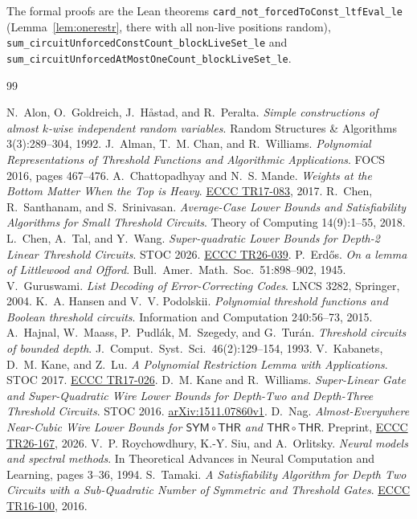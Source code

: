 \documentclass[11pt,letterpaper]{article}
\theoremstyle{remark}
\newcommand{\THR}{\mathsf{THR}}
\begin{document}
The formal proofs are the Lean theorems
\texttt{card\_not\_forcedToConst\_ltfEval\_le} (Lemma~\ref{lem:onerestr}, there
with all non-live positions random),
\texttt{sum\_circuitUnforcedConstCount\_blockLiveSet\_le} and
\texttt{sum\_circuitUnforcedAtMostOneCount\_blockLiveSet\_le}.

\renewcommand{\refname}{\texorpdfstring{\color{ink}References}{References}}
\begin{thebibliography}{99}\setlength{\itemsep}{0pt}\footnotesize

 N.~Alon, O.~Goldreich, J.~H{\aa}stad, and R.~Peralta.
\emph{Simple constructions of almost $k$-wise independent random variables}.
Random Structures \& Algorithms 3(3):289--304, 1992.
 J.~Alman, T.~M. Chan, and R.~Williams.
\emph{Polynomial Representations of Threshold Functions and Algorithmic
Applications}. FOCS 2016, pages 467--476.
 A.~Chattopadhyay and N.~S. Mande.
\emph{Weights at the Bottom Matter When the Top is Heavy}.
\href{https://eccc.weizmann.ac.il/report/2017/083/}{ECCC TR17-083}, 2017.
 R.~Chen, R.~Santhanam, and S.~Srinivasan.
\emph{Average-Case Lower Bounds and Satisfiability Algorithms for Small
Threshold Circuits}. Theory of Computing 14(9):1--55, 2018.
 L.~Chen, A.~Tal, and Y.~Wang.
\emph{Super-quadratic Lower Bounds for Depth-2 Linear Threshold Circuits}.
STOC 2026. \href{https://eccc.weizmann.ac.il/report/2026/039/}{ECCC TR26-039}.
 P.~Erd\H{o}s. \emph{On a lemma of Littlewood and Offord}.
Bull.\ Amer.\ Math.\ Soc.\ 51:898--902, 1945.
 V.~Guruswami. \emph{List Decoding of Error-Correcting Codes}.
LNCS 3282, Springer, 2004.
 K.~A. Hansen and V.~V. Podolskii. \emph{Polynomial threshold
functions and Boolean threshold circuits}. Information and Computation
240:56--73, 2015.
 A.~Hajnal, W.~Maass, P.~Pudl\'ak, M.~Szegedy, and
G.~Tur\'an. \emph{Threshold circuits of bounded depth}. J.\ Comput.\ Syst.\
Sci.\ 46(2):129--154, 1993.
 V.~Kabanets, D.~M. Kane, and Z.~Lu.
\emph{A Polynomial Restriction Lemma with Applications}. STOC 2017.
\href{https://eccc.weizmann.ac.il/report/2017/026/}{ECCC TR17-026}.
\bibitem{KW} D.~M. Kane and R.~Williams.
\emph{Super-Linear Gate and Super-Quadratic Wire Lower Bounds for Depth-Two
and Depth-Three Threshold Circuits}. STOC 2016.
\href{https://arxiv.org/abs/1511.07860}{arXiv:1511.07860v1}.
 D.~Nag. \emph{Almost-Everywhere Near-Cubic Wire Lower Bounds for
$\mathsf{SYM}\circ\THR$ and $\THR\circ\THR$}. Preprint,
\href{https://eccc.weizmann.ac.il/report/2026/167/}{ECCC TR26-167}, 2026.
\bibitem{RSO} V.~P. Roychowdhury, K.-Y. Siu, and A.~Orlitsky.
\emph{Neural models and spectral methods}. In Theoretical Advances in Neural
Computation and Learning, pages 3--36, 1994.
 S.~Tamaki. \emph{A Satisfiability Algorithm for Depth Two
Circuits with a Sub-Quadratic Number of Symmetric and Threshold Gates}.
\href{https://eccc.weizmann.ac.il/report/2016/100/}{ECCC TR16-100}, 2016.
\end{thebibliography}
\end{document}
